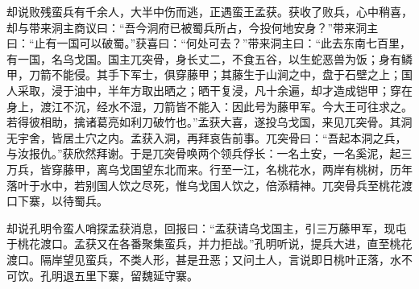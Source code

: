 却说败残蛮兵有千余人，大半中伤而逃，正遇蛮王孟获。获收了败兵，心中稍喜，却与带来洞主商议曰：“吾今洞府已被蜀兵所占，今投何地安身？”带来洞主曰：“止有一国可以破蜀。”获喜曰：“何处可去？”带来洞主曰：“此去东南七百里，有一国，名乌戈国。国主兀突骨，身长丈二，不食五谷，以生蛇恶兽为饭；身有鳞甲，刀箭不能侵。其手下军士，俱穿藤甲；其藤生于山涧之中，盘于石壁之上；国人采取，浸于油中，半年方取出晒之；晒干复浸，凡十余遍，却才造成铠甲；穿在身上，渡江不沉，经水不湿，刀箭皆不能入：因此号为藤甲军。今大王可往求之。若得彼相助，擒诸葛亮如利刀破竹也。”孟获大喜，遂投乌戈国，来见兀突骨。其洞无宇舍，皆居土穴之内。孟获入洞，再拜哀告前事。兀突骨曰：“吾起本洞之兵，与汝报仇。”获欣然拜谢。于是兀突骨唤两个领兵俘长：一名土安，一名奚泥，起三万兵，皆穿藤甲，离乌戈国望东北而来。行至一江，名桃花水，两岸有桃树，历年落叶于水中，若别国人饮之尽死，惟乌戈国人饮之，倍添精神。兀突骨兵至桃花渡口下寨，以待蜀兵。

却说孔明令蛮人哨探孟获消息，回报曰：“孟获请乌戈国主，引三万藤甲军，现屯于桃花渡口。孟获又在各番聚集蛮兵，并力拒战。”孔明听说，提兵大进，直至桃花渡口。隔岸望见蛮兵，不类人形，甚是丑恶；又问土人，言说即日桃叶正落，水不可饮。孔明退五里下寨，留魏延守寨。

